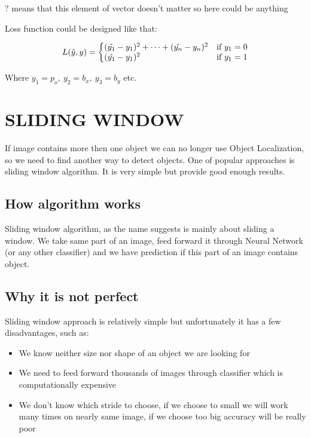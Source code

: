 \documentclass[letterpaper, 10 pt, conference]{ieeeconf}  %
\begin{document}
$?$ means that this element of vector doesn't matter so here could be anything

Loss function could be designed like that:

\begin{equation}
 L(\hat{y},y)=\left\{
  \begin{array}{@{}ll@{}}
    (\hat{y_1} - y_1)^2 + \dots + (\hat{y_n} - y_n)^2 & \text{if}\ y_1=0 \\
    (\hat{y_1} - y_1)^2 & \text{if}\ y_1=1
  \end{array}\right.
\end{equation} 

Where $y_1 = p_o, \: y_2 = b_x, \: y_3=b_y$ etc.

\section{SLIDING WINDOW}
If image contains more then one object we can no longer use Object Localization, so we need to find another way to detect objects. One of popular approaches is sliding window algorithm. It is very simple but provide good enough results. 

\subsection{How algorithm works}
Sliding window algorithm, as the name suggests is mainly about sliding a window. We take same part of an image, feed forward it through Neural Network (or any other classifier) and we have prediction if this part of an image contains object. 

\subsection{Why it is not perfect}
Sliding window approach is relatively simple but unfortunately it has a few disadvantages, such as:

\begin{itemize}

\item We know neither size nor shape of an object we are looking for

\item We need to feed forward thousands of images through classifier which is computationally expensive

\item We don't know which stride to choose, if we choose to small we will work many times on nearly same image, if we choose too big accuracy will be really poor


\end{itemize}
\end{document}
